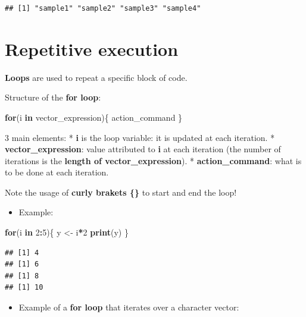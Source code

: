 \documentclass[]{book}
\newenvironment{Shaded}{\begin{snugshade}}{\end{snugshade}}
\newcommand{\ControlFlowTok}[1]{\textcolor[rgb]{0.13,0.29,0.53}{\textbf{#1}}}
\newcommand{\DecValTok}[1]{\textcolor[rgb]{0.00,0.00,0.81}{#1}}
\newcommand{\KeywordTok}[1]{\textcolor[rgb]{0.13,0.29,0.53}{\textbf{#1}}}
\newcommand{\NormalTok}[1]{#1}
\newcommand{\OperatorTok}[1]{\textcolor[rgb]{0.81,0.36,0.00}{\textbf{#1}}}
\newcommand{\StringTok}[1]{\textcolor[rgb]{0.31,0.60,0.02}{#1}}
\providecommand{\tightlist}{%
  \setlength{\itemsep}{0pt}\setlength{\parskip}{0pt}}
\begin{document}
\begin{verbatim}
## [1] "sample1" "sample2" "sample3" "sample4"
\end{verbatim}

\hypertarget{repetitive-execution}{%
\chapter{Repetitive execution}\label{repetitive-execution}}

\textbf{Loops} are used to repeat a specific block of code.

Structure of the \textbf{for loop}:

\begin{Shaded}
\begin{Highlighting}[]
\ControlFlowTok{for}\NormalTok{(i }\ControlFlowTok{in}\NormalTok{ vector_expression)\{}
\NormalTok{    action_command}
\NormalTok{\}}
\end{Highlighting}
\end{Shaded}

3 main elements:
* \textbf{i} is the loop variable: it is updated at each iteration.
* \textbf{vector\_expression}: value attributed to \textbf{i} at each iteration (the number of iterations is the \textbf{length of vector\_expression}).
* \textbf{action\_command}: what is to be done at each iteration.

Note the usage of \textbf{curly brakets \{\}} to start and end the loop!

\begin{itemize}
\tightlist
\item
  Example:
\end{itemize}

\begin{Shaded}
\begin{Highlighting}[]
\ControlFlowTok{for}\NormalTok{(i }\ControlFlowTok{in} \DecValTok{2}\OperatorTok{:}\DecValTok{5}\NormalTok{)\{}
\NormalTok{    y <-}\StringTok{ }\NormalTok{i}\OperatorTok{*}\DecValTok{2}
    \KeywordTok{print}\NormalTok{(y)}
\NormalTok{\}}
\end{Highlighting}
\end{Shaded}

\begin{verbatim}
## [1] 4
## [1] 6
## [1] 8
## [1] 10
\end{verbatim}

\begin{itemize}
\tightlist
\item
  Example of a \textbf{for loop} that iterates over a character vector:
\end{itemize}
\end{document}

